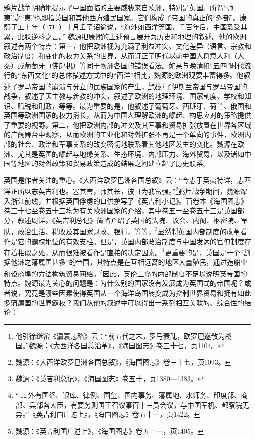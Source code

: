 \documentclass[a4paper, 12pt, openright]{ctexbook}
\begin{document}
鸦片战争明确地提示了中国面临的主要威胁来自欧洲，特别是英国。所谓“师夷”之“夷”也即指英国和其他西方殖民国家。它们构成了帝国的真正的“外部”。康熙于五十年（1711）十月壬子诏谕说，“海外如西洋等国，千百年后，中国恐受其累，此朕逆料之言。” 魏源把康熙的上述预言展开为历史和地理的叙述。他的欧洲叙述有两个特点：第一，他把欧洲视为充满了利益冲突、文化差异（语言、宗教和政治制度）和变化的权力关系的世界，从而订正了明代以前中国人将意大利（大秦）或葡萄牙（佛郎机）等同于欧洲各国的错误看法。如果与晚清和“五四”时代流行的“东西文化”的总体描述方式中的“西洋”相比，魏源的欧洲观要丰富得多。他叙述了罗马帝国的崩溃与分立的民族国家的产生，\footnote{他引徐继畲《瀛寰志略》云：“前五代之末，罗马衰乱，欧罗巴遂散为战国。”魏源：《大西洋各国总沿革》，《海国图志》卷三十七，页1104。}叙述了伊斯兰帝国与罗马帝国的战争，叙述了天主教与新教的冲突，叙述了欧洲的地理环境、国家制度、学校和知识、赋税和刑政，等等。最为重要的是，他叙述了葡萄牙、西班牙、荷兰、俄国和英国等欧洲国家的权力消长，从而为中国人理解欧洲的崛起、构思应对的策略提供了重要的视野。第二，他把欧洲内部的冲突及其军事和贸易扩张放置在世界各区域的广阔舞台中观察，从而欧洲的工业化和对外扩张不再是一个单向的事件，欧洲内部的社会、政治和军事关系的改变密切地联系着其他地区发生的变化。魏源在欧洲、尤其是英国的崛起与地缘关系、生态环境、内部压力、海外贸易，以及诸如中国等地区的对外政策和贸易政策造成的结果之间建立起了历史联系。

英国是作者关注的重心。《大西洋欧罗巴洲各国总叙》云：“今志于英夷特详，志西洋正所以志英吉利也。塞其害，师其长，彼且为我富强。”\footnote{魏源：《大西洋欧罗巴洲各国总叙》，《海国图志》卷三十七，页1093。}鸦片战争期间，魏源深入浙江前线，并根据英国俘虏的口供撰写了《英吉利小记》。百卷本《海国图志》卷三十七至卷五十三均为有关欧洲国家的介绍，其中卷五十至卷五十三是英国部分，叙述周详。《英吉利总记》简略介绍了英国的法院、议会、内阁、枢密院、军队，政治生活、税收及其国家财政、银行，等等，\footnote{魏源：《英吉利总记》，《海国图志》卷五十，页1380—1383。}显然将英国内部制度的改革看作是它的霸权地位的有效支柱。但是，英国内部政治制度与中国发达的官僚制度存在着相似之处，从而很难被看作是直接的决定因素。\footnote{“……外有国帑、银库、律例、国玺、国内事务、藩属地、水师务、印度部、商部、兵部各大臣，有要务则国王召议事百十三员会议，与中国军机、都察院无异。”《英吉利国广述上》，《海国图志》卷五十一，页1422。}更重要的是，英国是一个“割据他洲之藩属国甚多”的帝国，其特点是在互相远离的地区大量殖民，通过造船业和设商埠的方法构筑贸易网络。\footnote{魏源：《英吉利国广述上》，《海国图志》卷五十一，页1405。}因此，英伦三岛的内部制度不足以说明英帝国的特点。魏源最为关心的问题是：为什么别的国家没有发展成为英国式的帝国呢？或者说，究竟是哪些因素使得英国从一个海洋岛国转变成为控制世界贸易和拥有如此多藩属国的世界霸权？我们从他的叙述中可以得出一系列相互关联的、综合性的结论：
\end{document}
